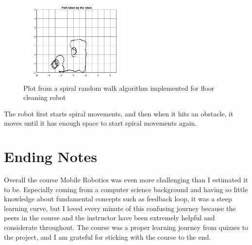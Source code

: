 \documentclass[12pt]{article}
\begin{document}
\begin{figure}[H]
    \centerline{\includegraphics[width=0.5\textwidth]{../../images/squiggles2.png}}
    \caption{Plot from a spiral random walk algorithm implemented for floor cleaning robot}
    \label{fig10}
\end{figure}

The robot first starts spiral movements, and then when it hits an obstacle, it moves until it has enough space to start spiral movements again. 

\section{Ending Notes}
Overall the course Mobile Robotics was even more challenging than I estimated it to be. Especially coming from a computer science background and having so little knowledge about fundamental concepts such as feedback loop, it was a steep learning curve, but I loved every minute of this confusing journey because the peers in the course and the instructor have been extremely helpful and considerate throughout. The course was a proper learning journey from quizzes to the project, and I am grateful for sticking with the course to the end. 
\end{document}

